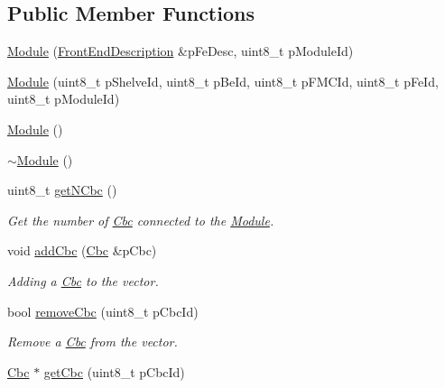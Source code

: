 \subsection*{Public Member Functions}
\begin{DoxyCompactItemize}
\item 
\hyperlink{class_ph2___hw_description_1_1_module_a8e5a7e697a51121a0a701c61f319b5e9}{Module} (\hyperlink{class_ph2___hw_description_1_1_front_end_description}{Front\-End\-Description} \&p\-Fe\-Desc, uint8\-\_\-t p\-Module\-Id)
\item 
\hyperlink{class_ph2___hw_description_1_1_module_acb5e5f17c946438f985c209563060f26}{Module} (uint8\-\_\-t p\-Shelve\-Id, uint8\-\_\-t p\-Be\-Id, uint8\-\_\-t p\-F\-M\-C\-Id, uint8\-\_\-t p\-Fe\-Id, uint8\-\_\-t p\-Module\-Id)
\item 
\hyperlink{class_ph2___hw_description_1_1_module_aaec7dd439bdf7a1db3f2136569a00125}{Module} ()
\item 
\hyperlink{class_ph2___hw_description_1_1_module_a8142f34ea2308ed78e8d0dbb042bc5f3}{$\sim$\-Module} ()
\item 
uint8\-\_\-t \hyperlink{class_ph2___hw_description_1_1_module_a8703442b1055c0c38b4157fc155ac084}{get\-N\-Cbc} ()
\begin{DoxyCompactList}\small\item\em Get the number of \hyperlink{class_ph2___hw_description_1_1_cbc}{Cbc} connected to the \hyperlink{class_ph2___hw_description_1_1_module}{Module}. \end{DoxyCompactList}\item 
void \hyperlink{class_ph2___hw_description_1_1_module_ac2743d5056bc3053bf472e5fd94bbf14}{add\-Cbc} (\hyperlink{class_ph2___hw_description_1_1_cbc}{Cbc} \&p\-Cbc)
\begin{DoxyCompactList}\small\item\em Adding a \hyperlink{class_ph2___hw_description_1_1_cbc}{Cbc} to the vector. \end{DoxyCompactList}\item 
bool \hyperlink{class_ph2___hw_description_1_1_module_a0aa7c940311bd13a32fd4e0f251c2d27}{remove\-Cbc} (uint8\-\_\-t p\-Cbc\-Id)
\begin{DoxyCompactList}\small\item\em Remove a \hyperlink{class_ph2___hw_description_1_1_cbc}{Cbc} from the vector. \end{DoxyCompactList}\item 
\hyperlink{class_ph2___hw_description_1_1_cbc}{Cbc} $\ast$ \hyperlink{class_ph2___hw_description_1_1_module_a05ccbee9ca3eb8022e359b5e9dabe783}{get\-Cbc} (uint8\-\_\-t p\-Cbc\-Id)

\end{DoxyCompactItemize}
